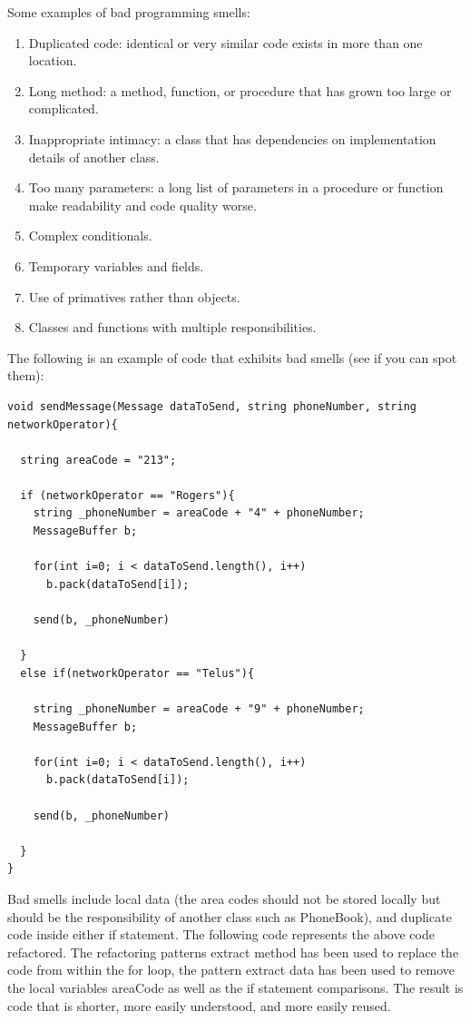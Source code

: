       Some examples of bad programming smells:
      \begin{enumerate}
       \item Duplicated code: identical or very similar code exists in more than one location.
       \item Long method: a method, function, or procedure that has grown too large or complicated.
       \item Inappropriate intimacy: a class that has dependencies on implementation details of another class.
       \item Too many parameters: a long list of parameters in a procedure or function make readability and code quality worse.
       \item Complex conditionals.
       \item Temporary variables and fields.
       \item Use of primatives rather than objects.
       \item Classes and functions with multiple responsibilities.
      \end{enumerate}

      The following is an example of code that exhibits bad smells (see if you can spot them):
      
      \begin{center}
      \begin{lstlisting}
void sendMessage(Message dataToSend, string phoneNumber, string networkOperator){
  
  string areaCode = "213";
  
  if (networkOperator == "Rogers"){
    string _phoneNumber = areaCode + "4" + phoneNumber;
    MessageBuffer b;

    for(int i=0; i < dataToSend.length(), i++)
      b.pack(dataToSend[i]);
    
    send(b, _phoneNumber)

  }
  else if(networkOperator == "Telus"){
  
    string _phoneNumber = areaCode + "9" + phoneNumber;
    MessageBuffer b;

    for(int i=0; i < dataToSend.length(), i++)
      b.pack(dataToSend[i]);
    
    send(b, _phoneNumber)
  
  }
}
      \end{lstlisting}
      \end{center}
      
      Bad smells include local data (the area codes should not be stored locally but should be the responsibility of another class such as PhoneBook), and duplicate code inside either if statement.
      The following code represents the above code refactored. The refactoring patterns extract method has been used to replace the code from within the for loop, the pattern extract data
      has been used to remove the local variables areaCode as well as the if statement comparisons. The result is code that is shorter, more easily understood, and more easily reused.
      
